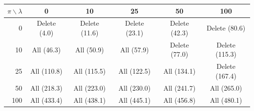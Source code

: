 \begin{tabular}{@{}rccccc@{}}
\toprule
$\pi\backslash\lambda$ & 0 & 10 & 25 & 50 & 100 \\
\midrule
0 & Delete (4.0) & Delete (11.6) & Delete (23.1) & Delete (42.3) & Delete (80.6) \\
10 & All (46.3) & All (50.9) & All (57.9) & Delete (77.0) & Delete (115.3) \\
25 & All (110.8) & All (115.5) & All (122.5) & All (134.1) & Delete (167.4) \\
50 & All (218.3) & All (223.0) & All (230.0) & All (241.7) & All (265.0) \\
100 & All (433.4) & All (438.1) & All (445.1) & All (456.8) & All (480.1) \\
\bottomrule
\end{tabular}
